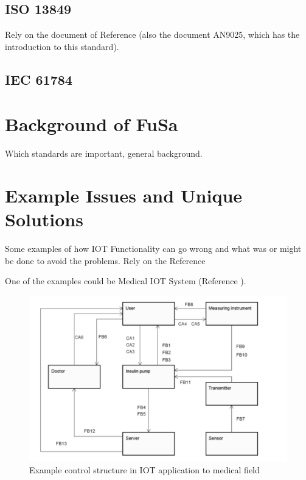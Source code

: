 \documentclass[conference]{IEEEtran}
\begin{document}
\subsection{ISO 13849}

Rely on the document of Reference \cite{meany_functional_2017} (also the document AN9025, which has the introduction to this standard).

\subsection{IEC 61784}

\section{Background of FuSa}

Which standards are important, general background.

\section{Example Issues and Unique Solutions}

Some examples of how IOT Functionality can go wrong and what was or might be done to avoid the problems. Rely on the Reference \cite{robinson_living_2019}

One of the examples could be Medical IOT System (Reference \cite{hayakawa_proposal_2018}).

\begin{figure}[htbp]
\centerline{\includegraphics[scale=.33]{Medical_IOT.png}}
\caption{Example control structure in IOT application to medical field \cite{hayakawa_proposal_2018}}
\label{timeline}
\end{figure}
\end{document}
